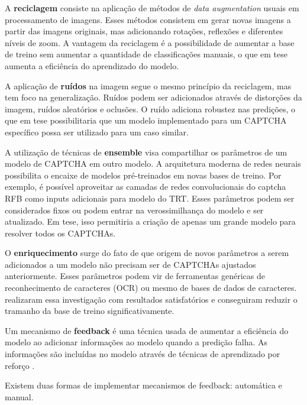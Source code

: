 \documentclass[12pt,]{report}
\begin{document}
A \textbf{reciclagem} consiste na aplicação de métodos de \emph{data
augmentation} usuais em processamento de imagens. Esses métodos
consistem em gerar novas imagens a partir das imagens originais, mas
adicionando rotações, reflexões e diferentes níveis de zoom. A vantagem
da reciclagem é a possibilidade de aumentar a base de treino sem
aumentar a quantidade de classificações manuais, o que em tese aumenta a
eficiência do aprendizado do modelo.

A aplicação de \textbf{ruídos} na imagem segue o mesmo princípio da
reciclagem, mas tem foco na generalização. Ruídos podem ser adicionados
através de distorções da imagem, ruídos aleatórios e oclusões. O ruído
adiciona robustez nas predições, o que em tese possibilitaria que um
modelo implementado para um CAPTCHA específico possa ser utilizado para
um caso similar.

A utilização de técnicas de \textbf{ensemble} visa compartilhar os
parâmetros de um modelo de CAPTCHA em outro modelo. A arquitetura
moderna de redes neurais possibilita o encaixe de modelos pré-treinados
em novas bases de treino. Por exemplo, é possível aproveitar as camadas
de redes convolucionais do captcha RFB como inputs adicionais para
modelo do TRT. Esses parâmetros podem ser considerados fixos ou podem
entrar na verossimilhança do modelo e ser atualizado. Em tese, isso
permitiria a criação de apenas um grande modelo para resolver todos os
CAPTCHAs.

O \textbf{enriquecimento} surge do fato de que origem de novos
parâmetros a serem adicionados a um modelo não precisam ser de CAPTCHAs
ajustados anteriormente. Esses parâmetros podem vir de ferramentas
genéricas de reconhecimento de caracteres (OCR) ou mesmo de bases de
dados de caracteres. \citet{george2017generative} realizaram essa
investigação com resultados satisfatórios e conseguiram reduzir o
tramanho da base de treino significativamente.

Um mecanismo de \textbf{feedback} é uma técnica usada de aumentar a
eficiência do modelo ao adicionar informações ao modelo quando a
predição falha. As informações são incluídas no modelo através de
técnicas de aprendizado por reforço \citep{sutton1998introduction}.

Existem duas formas de implementar mecanismos de feedback: automática e
manual.
\end{document}

